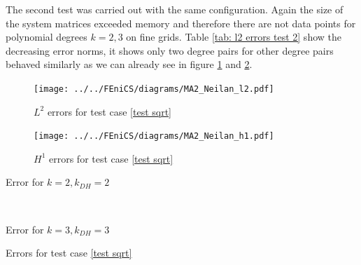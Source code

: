 The second test was carried out with the same configuration. Again the size of the system matrices exceeded memory and therefore there are not data points for polynomial degrees $k=2,3$ on fine grids. Table \ref{tab: l2 errors test 2} show the decreasing error norms, it shows only two degree pairs for other degree pairs behaved similarly as we can already see in figure \ref{fig: l2 errors test 2} and \ref{fig: h1 errors test 2}.
\begin{figure}[h]
\centering
	\texttt{[image: ../../FEniCS/diagrams/MA2\_Neilan\_l2.pdf]}
	\caption{$L^2$ errors for test case \ref{test sqrt} }
	\label{fig: l2 errors test 2}
\end{figure}
\begin{figure}[h]
	\centering
	\texttt{[image: ../../FEniCS/diagrams/MA2\_Neilan\_h1.pdf]}
	\caption{$H^1$ errors for test case \ref{test sqrt} }
	\label{fig: h1 errors test 2}
\end{figure}
\begin{table}[H]
	\begin{subtable}[b]{0.45\textwidth}
		\centering
		\pgfplotstabletypeset[
		columns={iterations, l2error, h1error,N},
		    every row 0 column 0/.style={set content=init},
		]{\MATwodegTwoTwo}
    	\caption{Error for $k=2, k_{DH}=2$}
   \end{subtable}
   ~
	\begin{subtable}[b]{0.45\textwidth}
		\centering
		\pgfplotstabletypeset[columns={iterations, l2error, h1error,N},
		    every row 0 column 0/.style={set content=init},
		]{\MATwodegThreeThree}
	\caption{Error for $k=3, k_{DH}=3$}
	\end{subtable}
	\caption{Errors for test case \ref{test sqrt}}
	\label{tab: l2 errors test 2}
\end{table}

